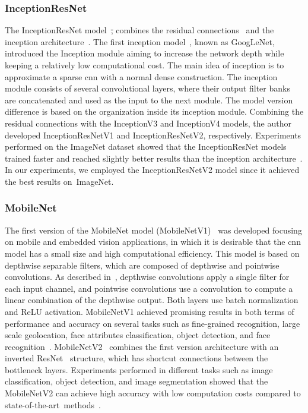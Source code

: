 \documentclass[journal]{IEEEtran}
\begin{document}
\subsubsection{\textbf{InceptionResNet}}

The InceptionResNet model~\cite{szegedy2016inceptionresnet}\st{,} combines the residual connections~\cite{he2016resnet} and the inception architecture~\cite{szegedy2016inception}.
The first inception model~\cite{szegedy2015inception}, known as GoogLeNet, introduced the Inception module aiming to increase the network depth while keeping a relatively low computational cost.
The main idea of inception is to approximate a sparse \gls{cnn} with a normal dense construction.
The inception module consists of several convolutional layers, where their output filter banks are concatenated and used as the input to the next module.
The model version difference is based on the organization inside its inception module.
Combining the residual connections with the InceptionV3 and InceptionV4 models, the author developed InceptionResNetV1 and InceptionResNetV2, respectively.
Experiments performed on the ImageNet dataset showed that the InceptionResNet models trained faster and reached slightly better results than the inception architecture~\cite{szegedy2016inceptionresnet}.
In our experiments, we employed the InceptionResNetV2 model since it achieved the best results on~ImageNet.

\subsubsection{\textbf{MobileNet}}

The first version of the MobileNet model (MobileNetV1)~\cite{howard2017mobilenet} was developed focusing on mobile and embedded vision applications, in which it is desirable that the \gls{cnn} model has a small size and high computational efficiency.
This model is based on depthwise separable filters, which are composed of depthwise and pointwise convolutions. 
As described in~\cite{howard2017mobilenet},  depthwise convolutions apply a single filter for each input channel, and pointwise convolutions use a  convolution to compute a linear combination of the depthwise output.
Both layers use batch normalization and ReLU activation.
MobileNetV1 achieved promising results in both terms of performance and accuracy on several tasks such as fine-grained recognition, large scale geolocation, face attributes classification, object detection, and face recognition~\cite{howard2017mobilenet}. 
MobileNetV2~\cite{sandler2018mobilenetv2} combines the first version architecture with an inverted ResNet~\cite{he2016resnet} structure, which has shortcut connections between the bottleneck layers.
Experiments performed in different tasks such as image classification, object detection, and image segmentation showed that the MobileNetV2 can achieve high accuracy with low computation costs compared to state-of-the-art~methods~\cite{sandler2018mobilenetv2}.
\end{document}
